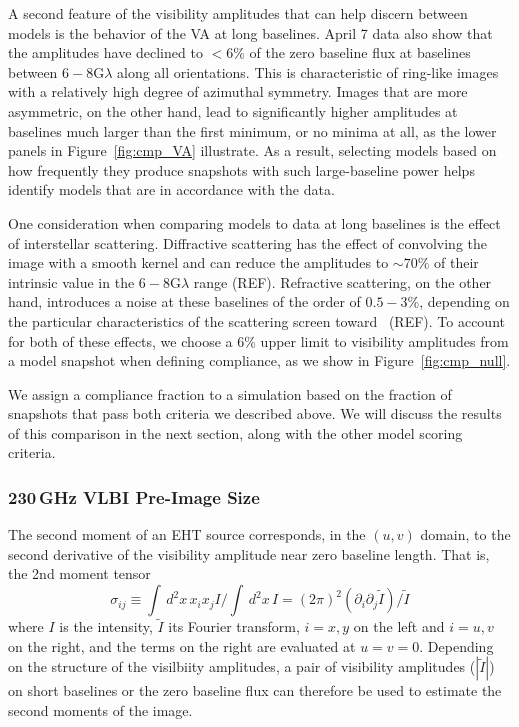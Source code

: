 A second feature of the visibility amplitudes that can help discern
between models is the behavior of the VA at long baselines.
April 7 data also show that the amplitudes have declined to $<6\%$ of
the zero baseline flux at baselines between $6-8$\;G$\lambda$ along
all orientations.
This is characteristic of ring-like images with a relatively high
degree of azimuthal symmetry.
Images that are more asymmetric, on the other hand, lead to
significantly higher amplitudes at baselines much larger than the
first minimum, or no minima at all, as the lower panels in
Figure~\ref{fig:cmp_VA} illustrate.
As a result, selecting models based on how frequently they produce
snapshots with such large-baseline power helps identify models that
are in accordance with the data.

One consideration when comparing models to data at long baselines is
the effect of interstellar scattering.
Diffractive scattering has the effect of convolving the image with a
smooth kernel and can reduce the amplitudes to $\sim 70\%$ of their
intrinsic value in the $6-8$\;G$\lambda$ range (REF).
Refractive scattering, on the other hand, introduces a noise at these
baselines of the order of $0.5-3\%$, depending on the particular
characteristics of the scattering screen toward \sgra\ (REF).
To account for both of these effects, we choose a $6\%$ upper limit to
visibility amplitudes from a model snapshot when defining compliance,
as we show in Figure~\ref{fig:cmp_null}.

We assign a compliance fraction to a simulation based on the fraction
of snapshots that pass both criteria we described above.
We will discuss the results of this comparison in the next section,
along with the other model scoring criteria.

\subsubsection{230\,GHz VLBI Pre-Image Size}


The second moment of an EHT source corresponds, in the $(u,v)$ domain, to
the second derivative of the visibility amplitude near zero baseline length.
That is, the 2nd moment tensor
\begin{equation}
    \sigma_{ij} \equiv \int \, d^2x\, x_i x_j I/\int \, d^2x \, I = (2\pi)^2 \left(\partial_i \partial_j \tilde{I}\right)/\tilde{I}
\end{equation}
where $I$ is the intensity, $\tilde{I}$ its Fourier transform, $i =
x,y$ on the left and $i = u,v$ on the right, and the terms on the
right are evaluated at $u = v = 0$.
Depending on the structure of the visilbiity amplitudes, a pair of visibility amplitudes ($|\tilde{I}|$) on short baselines or
the zero baseline flux can therefore be used to estimate the second moments of the
image.

